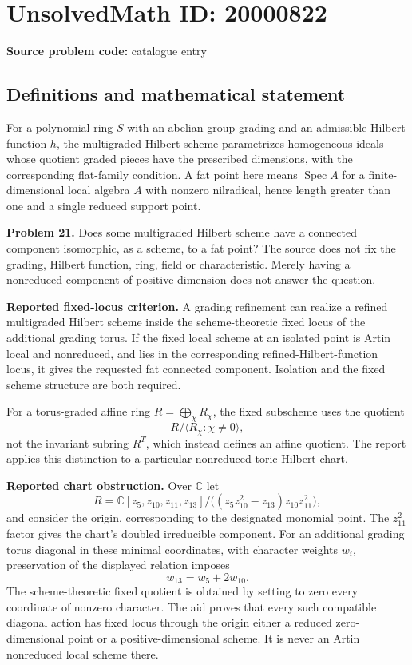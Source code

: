 \documentclass[11pt]{article}
\newcommand{\C}{\mathbb{C}}
\begin{document}
\section*{UnsolvedMath ID: 20000822}
\textbf{Source problem code:} catalogue entry
\subsection{Definitions and mathematical statement}
For a polynomial ring $S$ with an abelian-group grading and an admissible Hilbert function $h$, the multigraded Hilbert scheme parametrizes homogeneous ideals whose quotient graded pieces have the prescribed dimensions, with the corresponding flat-family condition. A fat point here means $\operatorname{Spec}A$ for a finite-dimensional local algebra $A$ with nonzero nilradical, hence length greater than one and a single reduced support point.

\textbf{Problem 21.} Does some multigraded Hilbert scheme have a connected component isomorphic, as a scheme, to a fat point? The source does not fix the grading, Hilbert function, ring, field or characteristic. Merely having a nonreduced component of positive dimension does not answer the question.

\textbf{Reported fixed-locus criterion.} A grading refinement can realize a refined multigraded Hilbert scheme inside the scheme-theoretic fixed locus of the additional grading torus. If the fixed local scheme at an isolated point is Artin local and nonreduced, and lies in the corresponding refined-Hilbert-function locus, it gives the requested fat connected component. Isolation and the fixed scheme structure are both required.

For a torus-graded affine ring $R=\bigoplus_\chi R_\chi$, the fixed subscheme uses the quotient
\[
 R\big/\langle R_\chi:\chi\ne0\rangle,
\]
not the invariant subring $R^T$, which instead defines an affine quotient. The report applies this distinction to a particular nonreduced toric Hilbert chart.

\textbf{Reported chart obstruction.} Over $\C$ let
\[
 R=\C[z_5,z_{10},z_{11},z_{13}]
 \big/\big((z_5z_{10}^2-z_{13})z_{10}z_{11}^2\big),
\]
and consider the origin, corresponding to the designated monomial point. The $z_{11}^2$ factor gives the chart's doubled irreducible component. For an additional grading torus diagonal in these minimal coordinates, with character weights $w_i$, preservation of the displayed relation imposes
\[
 w_{13}=w_5+2w_{10}.
\]
The scheme-theoretic fixed quotient is obtained by setting to zero every coordinate of nonzero character. The aid proves that every such compatible diagonal action has fixed locus through the origin either a reduced zero-dimensional point or a positive-dimensional scheme. It is never an Artin nonreduced local scheme there.
\end{document}
